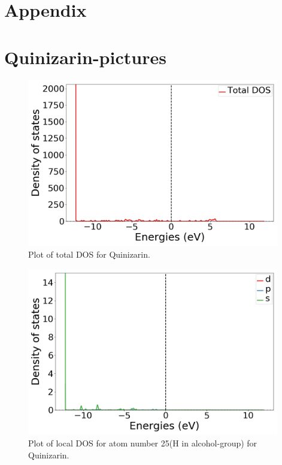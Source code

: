 \documentclass{article}
\begin{document}

\appendix

\section*{Appendix} \label{sec:Appendix}

\section{Quinizarin-pictures}

  \begin{figure}[H]
      \centering
      \includegraphics[width = 11cm]{../fig/basic_TDOS_1.png}
      \caption{Plot of total DOS for Quinizarin. }
      \label{fig:basic_TDOS_1}
  \end{figure}

  \begin{figure}[H]
      \centering
      \includegraphics[width = 11cm]{../fig/basic_LDOS25_1.png}
      \caption{Plot of local DOS for atom number 25(H in alcohol-group) for Quinizarin.}
      \label{fig:basic_LDOS25_1}
  \end{figure}
\end{document}
